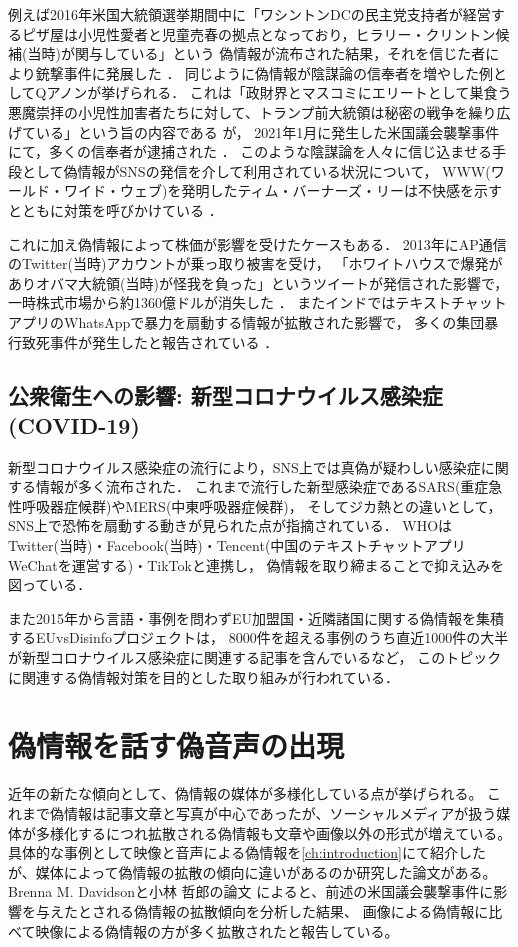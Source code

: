 例えば2016年米国大統領選挙期間中に「ワシントンDCの民主党支持者が経営するピザ屋は小児性愛者と児童売春の拠点となっており，ヒラリー・クリントン候補(当時)が関与している」という
偽情報が流布された結果，それを信じた者により銃撃事件に発展した \cite{agencies_2016}．
同じように偽情報が陰謀論の信奉者を増やした例としてQアノンが挙げられる．
これは「政財界とマスコミにエリートとして巣食う悪魔崇拝の小児性加害者たちに対して、トランプ前大統領は秘密の戦争を繰り広げている」という旨の内容である \cite{wendling_2021}が，
2021年1月に発生した米国議会襲撃事件にて，多くの信奉者が逮捕された \cite{hymes_mcdonald_watson_2021}．
このような陰謀論を人々に信じ込ませる手段として偽情報がSNSの発信を介して利用されている状況について，
WWW(ワールド・ワイド・ウェブ)を発明したティム・バーナーズ・リーは不快感を示すとともに対策を呼びかけている \cite{reklaitis_2018}．

これに加え偽情報によって株価が影響を受けたケースもある．
2013年にAP通信のTwitter(当時)アカウントが乗っ取り被害を受け，
「ホワイトハウスで爆発がありオバマ大統領(当時)が怪我を負った」というツイートが発信された影響で，
一時株式市場から約1360億ドルが消失した \cite{fisher_2013}．
またインドではテキストチャットアプリのWhatsAppで暴力を扇動する情報が拡散された影響で，
多くの集団暴行致死事件が発生したと報告されている \cite{frayer_2018}．

\subsection{公衆衛生への影響: 新型コロナウイルス感染症(COVID-19)}
新型コロナウイルス感染症の流行により，SNS上では真偽が疑わしい感染症に関する情報が多く流布された．
これまで流行した新型感染症であるSARS(重症急性呼吸器症候群)やMERS(中東呼吸器症候群)，
そしてジカ熱との違いとして，SNS上で恐怖を扇動する動きが見られた点が指摘されている．
WHOはTwitter(当時)・Facebook(当時)・Tencent(中国のテキストチャットアプリWeChatを運営する)・TikTokと連携し，
偽情報を取り締まることで抑え込みを図っている\cite{hao_2020}．

また2015年から言語・事例を問わずEU加盟国・近隣諸国に関する偽情報を集積するEUvsDisinfoプロジェクト\cite{euvsdisinfo_2020}は，
8000件を超える事例のうち直近1000件の大半が新型コロナウイルス感染症に関連する記事を含んでいる\cite{euvsdisinfo_2020_2}など，
このトピックに関連する偽情報対策を目的とした取り組みが行われている．

\section{偽情報を話す偽音声の出現}
近年の新たな傾向として、偽情報の媒体が多様化している点が挙げられる。
これまで偽情報は記事文章と写真が中心であったが、ソーシャルメディアが扱う媒体が多様化するにつれ拡散される偽情報も文章や画像以外の形式が増えている。
具体的な事例として映像と音声による偽情報を\cref{ch:introduction}にて紹介したが、媒体によって偽情報の拡散の傾向に違いがあるのか研究した論文がある。
Brenna M. Davidsonと小林 哲郎の論文 \cite{DAVIDSON2022107241}によると、前述の米国議会襲撃事件に影響を与えたとされる偽情報の拡散傾向を分析した結果、
画像による偽情報に比べて映像による偽情報の方が多く拡散されたと報告している。

